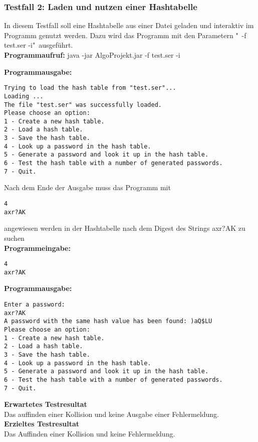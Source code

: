 \documentclass[11pt]{article}
\begin{document}
\subsubsection{Testfall 2: Laden und nutzen einer Hashtabelle}
In diesem Testfall soll eine Hashtabelle aus einer Datei geladen und interaktiv im Programm genutzt werden. Dazu wird das Programm mit den Parametern "\ -f test.ser -i"\ ausgeführt.\\
\textbf{Programmaufruf:} java -jar AlgoProjekt.jar -f test.ser -i \\
\begin{samepage}
\textbf{Programmausgabe:}
\begin{verbatim}
Trying to load the hash table from "test.ser"...
Loading ...
The file "test.ser" was successfully loaded.
Please choose an option:
1 - Create a new hash table.
2 - Load a hash table.
3 - Save the hash table.
4 - Look up a password in the hash table.
5 - Generate a password and look it up in the hash table.
6 - Test the hash table with a number of generated passwords.
7 - Quit.
\end{verbatim}
\end{samepage}
\begin{samepage}
Nach dem Ende der Ausgabe muss das Programm mit \begin{verbatim}4 
axr?AK 
\end{verbatim} 
angewiesen werden in der Hashtabelle nach dem Digest des Strings axr?AK zu suchen\\
\textbf{Programmeingabe:}
\begin{verbatim}
4
axr?AK
\end{verbatim}
\textbf{Programmausgabe:}
\begin{verbatim}
Enter a password:
axr?AK
A password with the same hash value has been found: )aQ$LU
Please choose an option:
1 - Create a new hash table.
2 - Load a hash table.
3 - Save the hash table.
4 - Look up a password in the hash table.
5 - Generate a password and look it up in the hash table.
6 - Test the hash table with a number of generated passwords.
7 - Quit.
\end{verbatim}
\end{samepage}
\textbf{Erwartetes Testresultat}\\
Das auffinden einer Kollision und keine Ausgabe einer Fehlermeldung.\\
\textbf{Erzieltes Testresultat}\\
Das Auffinden einer Kollision und keine Fehlermeldung.
\newpage
\end{document}
